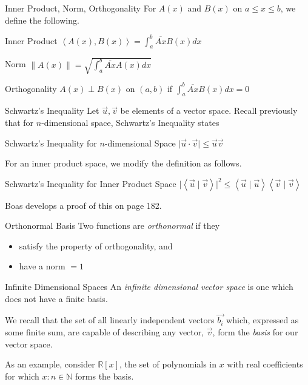 \documentclass{beamer}
\begin{document}
\begin{frame}{Inner Product, Norm, Orthogonality}
    For $A(x)$ and $B(x)$ on $a\leq x\leq b$, we define the following.
    \begin{block}{Inner Product}
        $\left <A(x), B(x) \right > = \int_a^b \overline{Ax}B(x)dx$
    \end{block}
    \begin{block}{Norm}
        $\lVert A(x)\rVert = \sqrt{\int_a^b \overline{Ax}A(x)dx}$
    \end{block}
    \begin{block}{Orthogonality}
        $A(x)\perp B(x)$ on $(a,b)$ if $\int_a^b \overline{Ax}B(x)dx=0$
    \end{block}
\end{frame}

\begin{frame}{Schwartz's Inequality}
    Let $\vec{u}, \vec{v}$ be elements of a vector space.  Recall previously that for $n$-dimensional space, Schwartz's Inequality states
    \begin{block}{Schwartz's Inequality for $n$-dimensional Space}
        $\lvert\vec{u}\cdot\vec{v}\rvert\leq \vec{u}\vec{v}$
    \end{block}
    For an inner product space, we modify the definition as follows.
    \begin{block}{Schwartz's Inequality for Inner Product Space}
        $\lvert\left<\vec{u}\mid\vec{v}\right>\rvert^2\leq\left<\vec{u}\mid\vec{u}\right>\left<\vec{v}\mid\vec{v}\right>$
    \end{block}
    Boas develops a proof of this on page 182.
\end{frame}

\begin{frame}{Orthonormal Basis}
    Two functions are \emph{orthonormal} if they
    \begin{itemize}
        \item satisfy the property of orthogonality, and
        \item have a norm $= 1$
    \end{itemize}
\end{frame}

\begin{frame}{Infinite Dimensional Spaces}
    An \emph{infinite dimensional vector space} is one which does not have a finite basis.
    \par We recall that the set of all linearly independent vectors $\vec{b_i}$ which, expressed as some finite sum, are capable of describing any vector, $\vec{v}$, form the \emph{basis} for our vector space.
    \par As an example, consider $\mathbb{R}[x]$, the set of polynomials in $x$ with real coefficients for which ${x:n\in\mathbb{N}}$ forms the basis.
\end{frame}
\end{document}
